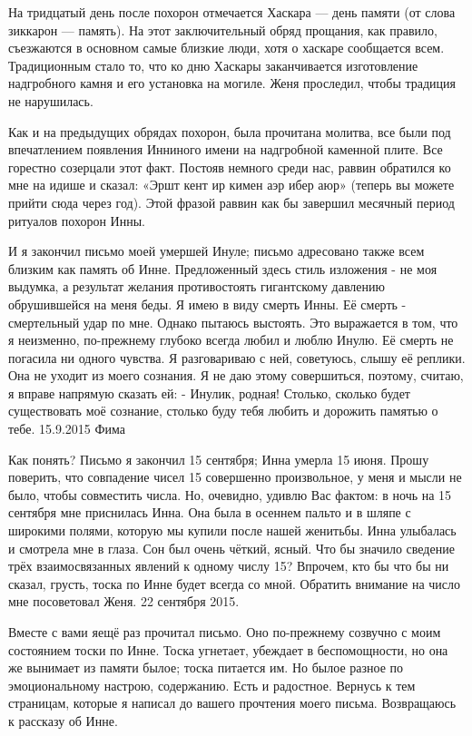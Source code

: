 \label{300-1}
На тридцатый день после похорон отмечается Хаскара — день памяти (от слова зиккарон — память). На этот заключительный обряд прощания, как правило, съезжаются в основном самые близкие люди, хотя о хаскаре сообщается всем. Традиционным стало то, что ко дню Хаскары заканчивается изготовление надгробного камня и его установка на могиле. Женя проследил, чтобы традиция не нарушилась.

Как и на предыдущих обрядах похорон, была прочитана молитва, все были под впечатлением появления Инниного имени на надгробной каменной плите. Все горестно созерцали этот факт. Постояв немного среди нас, раввин обратился ко мне на идише и сказал: «Эршт кент ир кимен аэр ибер аюр» (теперь вы можете прийти сюда через год). Этой фразой раввин как бы завершил месячный период ритуалов похорон Инны.

\label{301-1}
И я закончил письмо моей умершей Инуле; письмо адресовано также всем близким как память об Инне. Предложенный здесь стиль изложения - не моя выдумка, а результат желания противостоять гигантскому давлению обрушившейся на меня беды. Я имею в виду смерть Инны. Её смерть - смертельный удар по мне. Однако пытаюсь выстоять. Это выражается в том, что я неизменно, по-прежнему глубоко всегда любил и люблю Инулю. Её смерть не погасила ни одного чувства. Я разговариваю с ней, советуюсь, слышу её реплики. Она не уходит из моего сознания. Я не даю этому совершиться, поэтому, считаю, я вправе напрямую сказать ей: - Инулик, родная! Столько, сколько будет существовать моё сознание, столько буду тебя любить и дорожить памятью о тебе. 
  15.9.2015 Фима

\label{302-1}
Как понять? Письмо я закончил 15 сентября; Инна умерла 15 июня. Прошу поверить, что совпадение чисел 15 совершенно произвольное, у меня и мысли не было, чтобы совместить числа. Но, очевидно, удивлю Вас фактом: в ночь на 15 сентября мне приснилась Инна. Она была в осеннем пальто и в шляпе с широкими полями, которую мы купили после нашей женитьбы. Инна улыбалась и смотрела мне в глаза. Сон был очень чёткий, ясный. Что бы значило сведение трёх взаимосвязанных явлений к одному числу 15? Впрочем, кто бы что бы ни сказал, грусть, тоска по Инне будет всегда со мной. Обратить внимание на число мне посоветовал Женя. 
 22 сентября 2015.

\label{303-1}
Вместе с вами  яещё раз прочитал письмо. Оно по-прежнему созвучно с моим состоянием тоски по Инне. Тоска угнетает, убеждает в беспомощности, но она же вынимает из памяти былое; тоска питается им. Но былое разное по эмоциональному настрою, содержанию. Есть и радостное. Вернусь к тем страницам, которые я написал до вашего прочтения моего письма. Возвращаюсь к рассказу об Инне.

